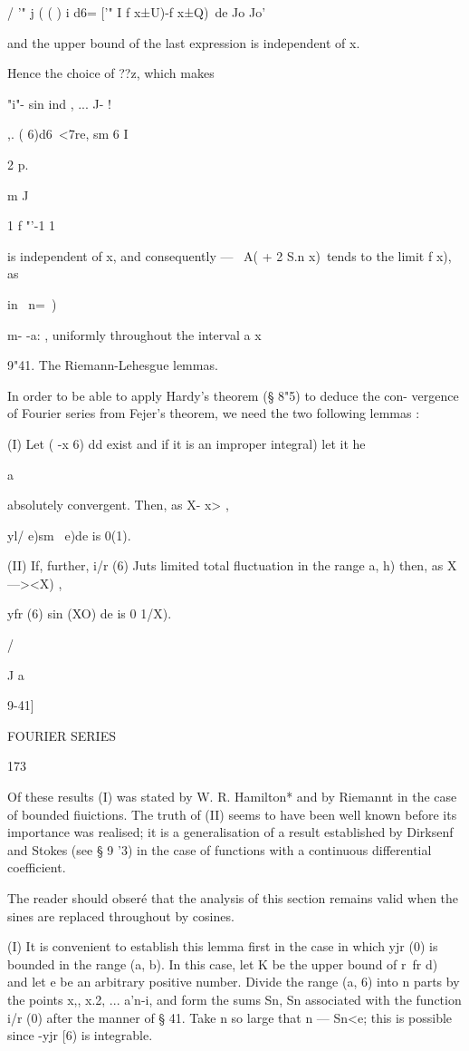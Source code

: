 / '" j ( ( ) i d6= ['" I f x±U)-f x±Q)\ de Jo Jo'

and the upper bound of the last expression is independent of x.

Hence the choice of ??z, which makes

"i"- sin ind , ... J- !

  ,. ( 6)d6\ <7re, sm 6 I

2 p.

m J

1 f "'-1 1

is independent of x, and consequently — \ A( + 2 S.n x)\ tends to the
limit f x), as

in \ n=\ )

m- -a: , uniformly throughout the interval a x%

9"41. The Riemann-Lehesgue lemmas.

In order to be able to apply Hardy's theorem (§ 8"5) to deduce the
con- vergence of Fourier series from Fejer's theorem, we need the two
following lemmas :

(I) Let ( -x 6) dd exist and if it is an improper integral) let it he

  a

absolutely convergent. Then, as X- x> ,

yl/ e)sm \ e)de is 0(1).

(II) If, further, i/r (6) Juts limited total fluctuation in the range
a, h) then, as X—><X) ,

yfr (6) sin (XO) de is 0 1/X).

/

J a

9-41]

FOURIER SERIES

173

Of these results (I) was stated by W. R. Hamilton* and by Riemannt in
the case of bounded fiuictions. The truth of (II) seems to have been
well known before its importance was realised; it is a generalisation
of a result established by Dirksenf and Stokes (see § 9 '3) in the
case of functions with a continuous differential coefficient.

The reader should obser\'e that the analysis of this section remains
valid when the sines are replaced throughout by cosines.

(I) It is convenient to establish this lemma first in the case in
which yjr (0) is bounded in the range (a, b). In this case, let K be
the upper bound of r\ fr d)\, and let e be an arbitrary positive
number. Divide the range (a, 6) into n parts by the points x,, x.2,
... a'n-i, and form the sums Sn, Sn associated with the function i/r
(0) after the manner of § 41. Take n so large that n — Sn<e; this is
possible since -yjr [6) is integrable.

